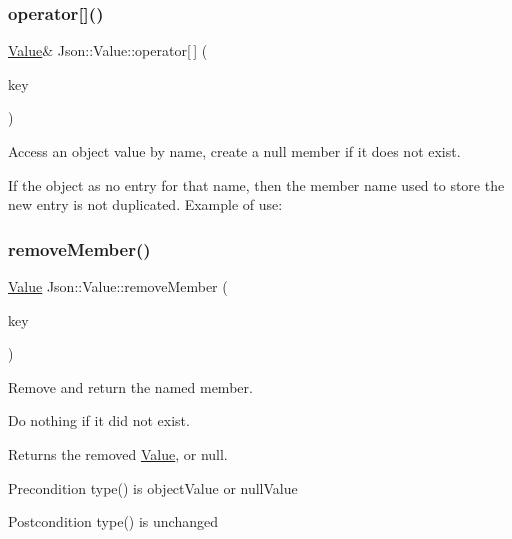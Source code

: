 \subsubsection{\texorpdfstring{operator[]()}{operator[]()}\hspace{0.1cm}{\footnotesize\ttfamily [7/7]}}
{\footnotesize\ttfamily \mbox{\hyperlink{class_json_1_1_value}{Value}}\& Json\+::\+Value\+::operator\mbox{[}$\,$\mbox{]} (\begin{DoxyParamCaption}\item[{const \mbox{\hyperlink{class_json_1_1_static_string}{Static\+String}} \&}]{key }\end{DoxyParamCaption})}



Access an object value by name, create a null member if it does not exist. 

If the object as no entry for that name, then the member name used to store the new entry is not duplicated. Example of use\+: 
\begin{DoxyCode}{0}
\end{DoxyCode}
 \mbox{\label{class_json_1_1_value_aa52f7873b95d29627d6e83ba96f69aaa}} 
\subsubsection{\texorpdfstring{removeMember()}{removeMember()}}
{\footnotesize\ttfamily \mbox{\hyperlink{class_json_1_1_value}{Value}} Json\+::\+Value\+::remove\+Member (\begin{DoxyParamCaption}\item[{const char $\ast$}]{key }\end{DoxyParamCaption})}



Remove and return the named member. 

Do nothing if it did not exist. \begin{DoxyReturn}{Returns}
the removed \mbox{\hyperlink{class_json_1_1_value}{Value}}, or null. 
\end{DoxyReturn}
\begin{DoxyPrecond}{Precondition}
type() is object\+Value or null\+Value 
\end{DoxyPrecond}
\begin{DoxyPostcond}{Postcondition}
type() is unchanged 
\end{DoxyPostcond}
\mbox{\label{class_json_1_1_value_aa284353271ada427dbfa04a42f2be407}} 
